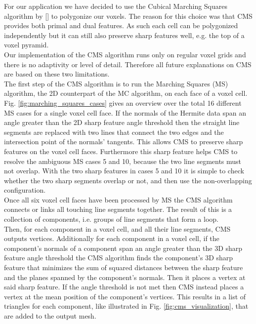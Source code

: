 For our application we have decided to use the Cubical Marching Squares algorithm by [] to polygonize our voxels. The reason for this choice was
that CMS provides both primal and dual features. As such each cell can be polygonized independently but it can still also preserve sharp features well, e.g. the top of a voxel pyramid.\\
Our implementation of the CMS algorithm runs only on regular voxel grids and
there is no adaptivity or level of detail. Therefore all future explanations on CMS are based on these two limitations.\\
The first step of the CMS algorithm is to run the Marching Squares (MS) algorithm, the 2D counterpart of the MC algorithm, on each face of a voxel cell. Fig. \ref{fig:marching_squares_cases} gives an overview over the total 16 different MS cases for a single voxel cell face. If the normals of the Hermite data span an angle greater than the 2D sharp feature angle threshold then the straight line segments are replaced with two lines that connect the two edges and the intersection point of the normals' tangents. This allows CMS to preserve sharp features on the voxel cell faces. Furthermore this sharp feature helps CMS to resolve the ambiguous MS cases 5 and 10, because the two line segments must not overlap. With the two sharp features in cases 5 and 10 it is simple to check
whether the two sharp segments overlap or not, and then use the non-overlapping configuration.\\
Once all six voxel cell faces have been processed by MS the CMS algorithm connects or links all touching line segments together. The result of this is a collection of components, i.e. groups of line segments that form a loop.\\
Then, for each component in a voxel cell, and all their line segments, CMS outputs vertices. Additionally for each component in a voxel cell, if the component's normals of a component span an angle greater than the 3D sharp feature angle threshold the CMS algorithm finds the component's 3D sharp feature that minimizes the sum of squared distances between the sharp feature and the planes spanned by the component's normals. Then it places a vertex at said sharp feature. If the angle threshold is not met then CMS instead places a vertex at the mean position of the component's vertices. This results in a list of triangles for each component, like illustrated in Fig. \ref{fig:cms_visualization}, that are added to the output mesh.





